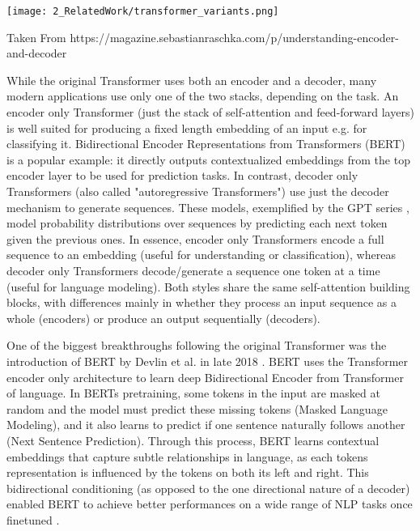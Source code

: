 \begin{marginfigure}[] %
    \texttt{[image: 2\_RelatedWork/transformer\_variants.png]}
    \caption{\label{fig:malratios}
    Taken From https://magazine.sebastianraschka.com/p/understanding-encoder-and-decoder}
\end{marginfigure}

While the original Transformer uses both an encoder and a decoder, 
many modern applications use only one of the two stacks, depending on the task. 
An encoder only Transformer (just the stack of self-attention and feed-forward layers) 
is well suited for producing a fixed length embedding of an input e.g. for classifying it. 
Bidirectional Encoder Representations from Transformers (BERT) \cite{bert} is a popular example: 
it directly outputs contextualized embeddings from the top encoder layer to be used for prediction tasks. 
In contrast, decoder only Transformers (also called "autoregressive Transformers") 
use just the decoder mechanism to generate sequences. 
These models, exemplified by the GPT series \cite{gpt1, gpt2, gpt3, gpt4}, 
model probability distributions over sequences by predicting each next token given the previous ones. 
In essence, encoder only Transformers encode a full sequence to an embedding 
(useful for understanding or classification), 
whereas decoder only Transformers decode/generate a sequence one token at a time 
(useful for language modeling). 
Both styles share the same self-attention building blocks, 
with differences mainly in whether they process an input sequence as a whole (encoders) 
or produce an output sequentially (decoders). 

One of the biggest breakthroughs following the original Transformer \cite{attention} 
was the introduction of BERT by Devlin et al. in late 2018 \cite{bert}. 
BERT uses the Transformer encoder only architecture to learn deep Bidirectional Encoder from Transformer 
of language.
In BERTs pretraining, some tokens in the input are masked at random and the model must predict 
these missing tokens (Masked Language Modeling), 
and it also learns to predict if one sentence naturally follows another (Next Sentence Prediction). 
Through this process, BERT learns contextual embeddings that capture subtle relationships in language, 
as each tokens representation is influenced by the tokens on both its left and right. 
This bidirectional conditioning (as opposed to the one directional nature of a decoder) 
enabled BERT to achieve better performances on a wide range of NLP tasks once finetuned \cite{scoreBERT}.

